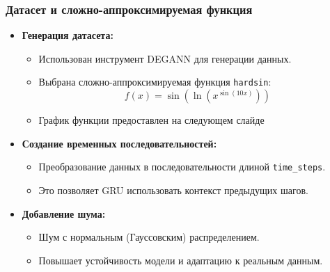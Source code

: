 \documentclass
  [ russian
  , aspectratio=1610 %
  ] {beamer}
\begin{document}
\begin{frame}
    \frametitle{Датасет и сложно-аппроксимируемая функция}
    \begin{itemize}
        \item \textbf{Генерация датасета:}
        \begin{itemize}
            \item Использован инструмент DEGANN для генерации данных.
            \item Выбрана сложно-аппроксимируемая функция \texttt{hardsin}:
            \[
            f(x) = \sin\left(\ln(x^{\sin(10x)})\right)
            \]
            \item График функции предоставлен на следующем слайде
        \end{itemize}
        \item \textbf{Создание временных последовательностей:}
        \begin{itemize}
            \item Преобразование данных в последовательности длиной \texttt{time\_steps}.
            \item Это позволяет GRU использовать контекст предыдущих шагов.
        \end{itemize}
        \item \textbf{Добавление шума:}
        \begin{itemize}
            \item Шум с нормальным (Гауссовским) распределением.
            \item Повышает устойчивость модели и адаптацию к реальным данным.
        \end{itemize}
    \end{itemize}
\end{frame}
\end{document}
